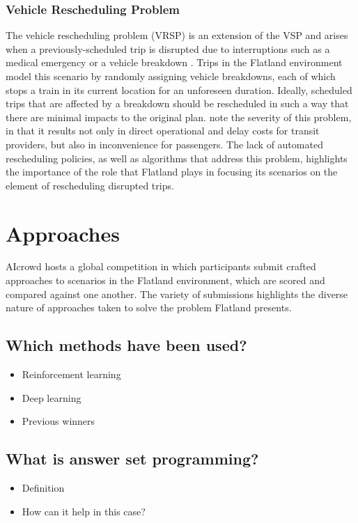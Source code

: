 \documentclass[11pt]{article}
\begin{document}
\subsubsection{Vehicle Rescheduling Problem}
The vehicle rescheduling problem (VRSP) is an extension of the VSP and arises when a previously-scheduled trip is disrupted due to interruptions such as a medical emergency or a vehicle breakdown \cite{limibo07a}.  Trips in the Flatland environment model this scenario by randomly assigning vehicle breakdowns, each of which stops a train in its current location for an unforeseen duration.  Ideally, scheduled trips that are affected by a breakdown should be rescheduled in such a way that there are minimal impacts to the original plan.  \cite{limibo07a} note the severity of this problem, in that it results not only in direct operational and delay costs for transit providers, but also in inconvenience for passengers.  The lack of automated rescheduling policies, as well as algorithms that address this problem, highlights the importance of the role that Flatland plays in focusing its scenarios on the element of rescheduling disrupted trips.


\pagebreak
\section{Approaches}
AIcrowd hosts a global competition in which participants submit crafted approaches to scenarios in the Flatland environment, which are scored and compared against one another.  The variety of submissions highlights the diverse nature of approaches taken to solve the problem Flatland presents.
\subsection{Which methods have been used?}
\begin{itemize}
  \item Reinforcement learning
  \item Deep learning
  \item Previous winners
\end{itemize}

\subsection{What is answer set programming?}
\begin{itemize}
  \item Definition
  \item How can it help in this case?
\end{itemize}
\end{document}
